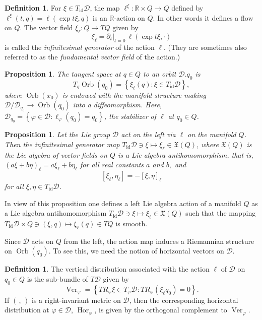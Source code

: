 \documentclass[a5paper,10pt,twoside]{article}
\newcommand{\R}{\ensuremath{\mathbb{R}}}
\newcommand{\cD}{\ensuremath{\mathcal{D}}}
\DeclareMathOperator*{\Orb}{Orb}
\DeclareMathOperator*{\Ver}{Ver}
\DeclareMathOperator*{\Hor}{Hor}
\DeclareMathOperator*{\id}{id}
\theoremstyle{plain}
\newtheorem{prop}[teo]{Proposition}
\theoremstyle{definition}
\newtheorem{defn}[teo]{Definition}
\theoremstyle{remark}
\begin{document}
\begin{defn}
For $\xi \in T_{\id}\cD$, the map $\ell^\xi:\R\times Q\to Q$ defined by $\ell^\xi(t,q)=\ell(\exp t\xi,q)$ is an $\R$-action on $Q$. In other words it defines a flow on $Q$. The vector field $\xi_\ell: Q\to TQ$ given by 
$$
\xi_\ell = \partial_t |_{t=0}\, \ell(\exp t\xi,\cdot)
$$ 
is called the \textit{infinitesimal generator} of the action $\ell$. (They are sometimes also referred to as the \textit{fundamental vector field} of the action.)
\end{defn}


\begin{prop}
	\label{prop:tangent-orbit}
The tangent space at $q\in Q$ to an orbit $\cD.q_0$ is
\[
T_q\Orb(q_0)=\left\{\xi_\ell(q):\xi\in T_{\id}\cD \right\},
\]
where $\Orb(x_0)$ is endowed with the manifold structure making $\cD/\cD_{q_0}\to\Orb(q_0)$ into a diffeomorphism. Here, $\cD_{q_0}=\left\{\varphi\in\cD:\ell_\varphi(q_0)=q_0\right\}$, the stabilizer of $\ell$ at $q_0\in Q$.
\end{prop}

\begin{prop}
Let the Lie group $\cD$ act on the left via $\ell$ on the manifold $Q$. Then the infinitesimal generator map $T_{\id}\cD\ni\xi\mapsto\xi_\ell\in\mathfrak{X}(Q)$, where $\mathfrak{X}(Q)$ is the Lie algebra of vector fields on $Q$ is a Lie algebra antihomomorphism, that is, $(a\xi+b\eta)_\ell=a\xi_\ell+b\eta_\ell$ for all real constants $a$ and $b,$ and $$[\xi_\ell,\eta_\ell]=-[\xi,\eta]_\ell$$ for all $\xi,\eta\in T_{\id}\cD$.
\end{prop}

In view of this proposition one defines a left Lie algebra action of a manifold $Q$ as a Lie algebra antihomomorphism $T_{\id}\cD\ni \xi\mapsto \xi_\ell\in\mathfrak{X}(Q)$ such that the mapping $T_{\id}\cD\times Q\ni (\xi,q)\mapsto \xi_\ell(q)\in TQ$ is smooth.


Since $\cD$ acts on $Q$ from the left, the action map induces a Riemannian structure
on $\Orb(q_0)$. To see this, we need the notion of horizontal vectors on $\cD$.

\begin{defn}
	The vertical distribution associated with the action $\ell$ of $\cD$ on $q_0\in Q$ is the sub-bundle of $T\cD$ given by 
	\[
	{\Ver}_\varphi = \left\{TR_\varphi \xi\in T_\varphi\cD: TR_\varphi(\xi_\ell q_0)=0 \right\}.
	\]
	If $(\, ,\,)$ is a right-invariant metric on $\cD$, then the corresponding horizontal distribution at $\varphi\in\cD$, $\Hor_\varphi$, is given by the orthogonal complement to $\Ver_\varphi$.
\end{defn}
\end{document}
